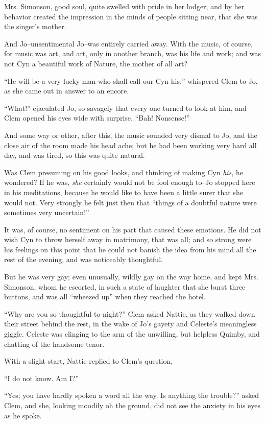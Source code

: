 Mrs. Simonson, good soul, quite swelled with pride in her lodger, and by
her behavior created the impression in the minds of people sitting near,
that she was the singer's mother.

And Jo--unsentimental Jo--was entirely carried away. With the music, of
course, for music was art, and art, only in another branch, was his life
and work; and was not Cyn a beautiful work of Nature, the mother of all
art?

``He will be a very lucky man who shall call our Cyn his,'' whispered Clem
to Jo, as she came out in answer to an encore.

``What!'' ejaculated Jo, so savagely that every one turned to look at him,
and Clem opened his eyes wide with surprise. ``Bah! Nonsense!''

And some way or other, after this, the music sounded very dismal to Jo,
and the close air of the room made his head ache; but he had been
working very hard all day, and was tired, so this was quite natural.

Was Clem presuming on his good looks, and thinking of making Cyn \emph{his},
he wondered? If he was, \emph{she} certainly would not be fool enough to--Jo
stopped here in his meditations, because he would like to have been a
little surer that she would not. Very strongly he felt just then that
``things of a doubtful nature were sometimes very uncertain!''

It was, of course, no sentiment on his part that caused these emotions.
He did not wish Cyn to throw herself away in matrimony, that was all;
and so strong were his feelings on this point that he could not banish
the idea from his mind all the rest of the evening, and was noticeably
thoughtful.

But he was very gay; even unusually, wildly gay on the way home, and
kept Mrs. Simonson, whom he escorted, in such a state of laughter that
she burst three buttons, and was all ``wheezed up'' when they reached the
hotel.

``Why are you so thoughtful to-night?'' Clem asked Nattie, as they walked
down their street behind the rest, in the wake of Jo's gayety and
Celeste's meaningless giggle. Celeste was clinging to the arm of the
unwilling, but helpless Quimby, and chatting of the handsome tenor.

With a slight start, Nattie replied to Clem's question,

``I do not know. Am I?''

``Yes; you have hardly spoken a word all the way. Is anything the
trouble?'' asked Clem, and she, looking moodily oh the ground, did not
see the anxiety in his eyes as he spoke.

